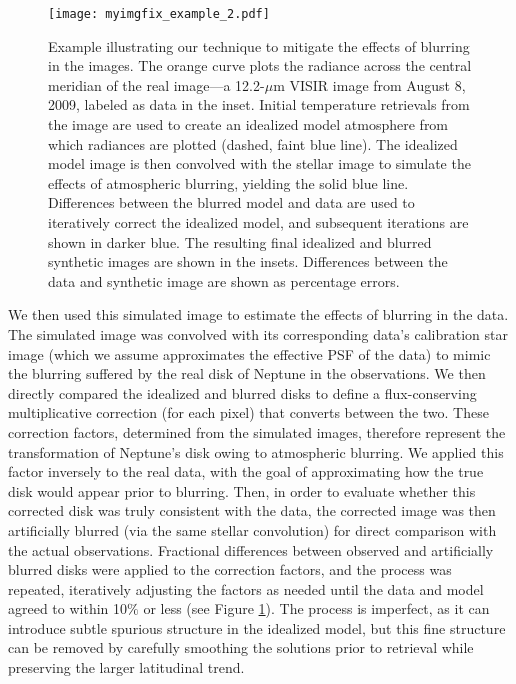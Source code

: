 \documentclass[twocolumn,10pt]{aastex631}
\begin{document}
\begin{figure}[h]
    \centering
    \texttt{[image: myimgfix\_example\_2.pdf]}
    \caption{Example illustrating our technique to mitigate the effects of blurring in the images. The orange curve plots the radiance across the central meridian of the real image---a 12.2-$\mu$m VISIR image from August 8, 2009, labeled as data in the inset. Initial temperature retrievals from the image are used to create an idealized model atmosphere from which radiances are plotted (dashed, faint blue line). The idealized model image is then convolved with the stellar image to simulate the effects of atmospheric blurring, yielding the solid blue line. Differences between the blurred model and data are used to iteratively correct the idealized model, and subsequent iterations are shown in darker blue. The resulting final idealized and blurred synthetic images are shown in the insets. Differences between the data and synthetic image are shown as percentage errors. }
    \label{fig:imgfix}
\end{figure}

We then used this simulated image to estimate the effects of blurring in the data.  The simulated image was convolved with its corresponding data's calibration star image (which we assume approximates the effective PSF of the data) to mimic the blurring suffered by the real disk of Neptune in the observations. We then directly compared the idealized and blurred disks to define a flux-conserving multiplicative correction (for each pixel) that converts between the two. These correction factors, determined from the simulated images, therefore represent the transformation of Neptune's disk owing to atmospheric blurring. We applied this factor inversely to the real data, with the goal of approximating how the true disk would appear prior to blurring. Then, in order to evaluate whether this corrected disk was truly consistent with the data, the corrected image was then artificially blurred (via the same stellar convolution) for direct comparison with the actual observations. Fractional differences between observed and artificially blurred disks were applied to the correction factors, and the process was repeated, iteratively adjusting the factors as needed until the data and model agreed to within 10$\%$ or less (see Figure \ref{fig:imgfix}). The process is imperfect, as it can introduce subtle spurious structure in the idealized model, but this fine structure can be removed by carefully smoothing the solutions prior to retrieval while preserving the larger latitudinal trend. 
\end{document}
